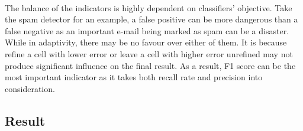\paragraph{}
The balance of the indicators is highly dependent on classifiers' objective.
Take the spam detector for an example, a false positive can be more dangerous than a false negative as an important e-mail being marked as spam can be a disaster.
While in adaptivity, there may be no favour over either of them.
It is because refine a cell with lower error or leave a cell with higher error unrefined may not produce significant influence on the final result.
As a result, F1 score can be the most important indicator as it takes both recall rate and precision into consideration.


\subsection{Result}
